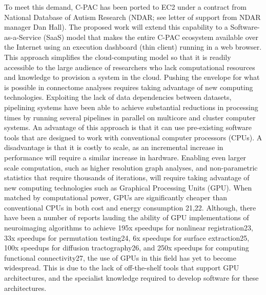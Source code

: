 \documentclass[1p,11pt]{elsarticle}
\begin{document}
To meet this demand, C-PAC has been
ported to EC2 under a contract from National Database of Autism Research
(NDAR; see letter of support from NDAR manager Dan Hall). The proposed
work will extend this capability to a Software-as-a-Service (SaaS) model
that makes the entire C-PAC ecosystem available over the Internet using
an execution dashboard (thin client) running in a web browser. This
approach simplifies the cloud-computing model so that it is readily
accessible to the large audience of researchers who lack computational
resources and knowledge to provision a system in the cloud.  Pushing the
envelope for what is possible in connectome analyses requires taking
advantage of new computing technologies. Exploiting the lack of data
dependencies between datasets, pipelining systems have been able to
achieve substantial reductions in processing times by running several
pipelines in parallel on multicore and cluster computer systems. An
advantage of this approach is that it can use pre-existing software
tools that are designed to work with conventional computer processors
(CPUs). A disadvantage is that it is costly to scale, as an incremental
increase in performance will require a similar increase in hardware.
Enabling even larger scale computation, such as higher resolution graph
analyses, and non-parametric statistics that require thousands of
iterations, will require taking advantage of new computing technologies
such as Graphical Processing Units (GPU). When matched by computational
power, GPUs are significantly cheaper than conventional CPUs in both
cost and energy consumption 21,22. Although, there have been a number of
reports lauding the ability of GPU implementations of neuroimaging
algorithms to achieve 195x speedups for nonlinear registration23, 33x
speedups for permutation testing24, 6x speedups for surface
extraction25, 100x speedups for diffusion tractography26, and 250x
speedups for computing functional connectivity27, the use of GPUs in
this field has yet to become widespread. This is due to the lack of
off-the-shelf tools that support GPU architectures, and the specialist
knowledge required to develop software for these architectures. 
\end{document}
